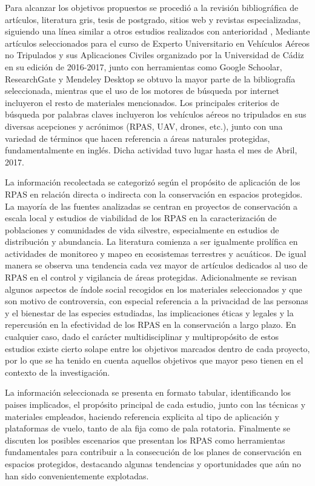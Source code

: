 \documentclass[9t,twocolumn]{article}
\begin{document}
Para alcanzar los objetivos propuestos se procedió a la revisión
bibliográfica de artículos, literatura gris, tesis de postgrado, sitios
web y revistas especializadas, siguiendo una línea similar a otros
estudios realizados con anterioridad \citet{Linchant2015},
\citep{Christie2016} Mediante artículos seleccionados para el curso de
Experto Universitario en Vehículos Aéreos no Tripulados y sus
Aplicaciones Civiles organizado por la Universidad de Cádiz en su
edición de 2016-2017, junto con herramientas como Google Schoolar,
ResearchGate y Mendeley Desktop se obtuvo la mayor parte de la
bibliografía seleccionada, mientras que el uso de los motores de
búsqueda por internet incluyeron el resto de materiales mencionados. Los
principales criterios de búsqueda por palabras claves incluyeron los
vehículos aéreos no tripulados en sus diversas acepciones y acrónimos
(RPAS, UAV, drones, etc.), junto con una variedad de términos que hacen
referencia a áreas naturales protegidas, fundamentalmente en inglés.
Dicha actividad tuvo lugar hasta el mes de Abril, 2017.

La información recolectada se categorizó según el propósito de
aplicación de los RPAS en relación directa o indirecta con la
conservación en espacios protegidos. La mayoría de las fuentes
analizadas se centran en proyectos de conservación a escala local y
estudios de viabilidad de los RPAS en la caracterización de poblaciones
y comunidades de vida silvestre, especialmente en estudios de
distribución y abundancia. La literatura comienza a ser igualmente
prolífica en actividades de monitoreo y mapeo en ecosistemas terrestres
y acuáticos. De igual manera se observa una tendencia cada vez mayor de
artículos dedicados al uso de RPAS en el control y vigilancia de áreas
protegidas. Adicionalmente se revisan algunos aspectos de índole social
recogidos en los materiales seleccionados y que son motivo de
controversia, con especial referencia a la privacidad de las personas y
el bienestar de las especies estudiadas, las implicaciones éticas y
legales y la repercusión en la efectividad de los RPAS en la
conservación a largo plazo. En cualquier caso, dado el carácter
multidisciplinar y multipropósito de estos estudios existe cierto solape
entre los objetivos marcados dentro de cada proyecto, por lo que se ha
tenido en cuenta aquellos objetivos que mayor peso tienen en el contexto
de la investigación.

La información seleccionada se presenta en formato tabular,
identificando los paises implicados, el propósito principal de cada
estudio, junto con las técnicas y materiales empleados, haciendo
referencia explicita al tipo de aplicación y plataformas de vuelo, tanto
de ala fija como de pala rotatoria. Finalmente se discuten los posibles
escenarios que presentan los RPAS como herramientas fundamentales para
contribuir a la consecución de los planes de conservación en espacios
protegidos, destacando algunas tendencias y oportunidades que aún no han
sido convenientemente explotadas.
\end{document}
